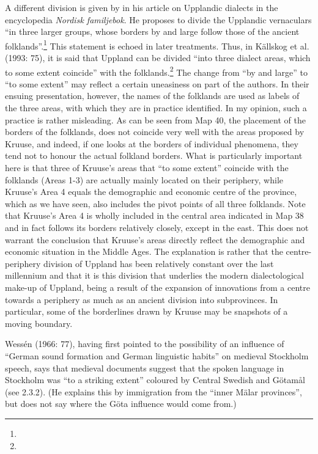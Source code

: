\begin{styleBodytextC}
A different division is given by \citet[1194]{Hesselman1920} in his article on Upplandic dialects in the encyclopedia \textit{Nordisk familjebok}. He proposes to divide the Upplandic vernaculars “in three larger groups, whose borders by and large follow those of the ancient folklands”.\footnote{} This statement is echoed in later treatments. Thus, in Källskog et al. (1993: 75), it is said that Uppland can be divided “into three dialect areas, which to some extent coincide” with the folklands.\footnote{} The change from “by and large” to “to some extent” may reflect a certain uneasiness on part of the authors. In their ensuing presentation, however, the names of the folklands are used as labels of the three areas, with which they are in practice identified. In my opinion, such a practice is rather misleading. As can be seen from Map 40, the placement of the borders of the folklands, does not coincide very well with the areas proposed by Kruuse, and indeed, if one looks at the borders of individual phenomena, they tend not to honour the actual folkland borders. What is particularly important here is that three of Kruuse’s areas that “to some extent” coincide with the folklands (Areas 1-3) are actually mainly located on their periphery, while Kruuse’s Area 4 equals the demographic and economic centre of the province, which as we have seen, also includes the pivot points of all three folklands. Note that Kruuse’s Area 4 is wholly included in the central area indicated in Map 38 and in fact follows its borders relatively closely, except in the east. This does not warrant the conclusion that Kruuse’s areas directly reflect the demographic and economic situation in the Middle Ages. The explanation is rather that the centre-periphery division of Uppland has been relatively constant over the last millennium and that it is this division that underlies the modern dialectological make-up of Uppland, being a result of the expansion of innovations from a centre towards a periphery as much as an ancient division into subprovinces. In particular, some of the borderlines drawn by Kruuse may be snapshots of a moving boundary.

\end{styleBodytextC}

\begin{styleBodytextC}
Wessén (1966: 77), having first pointed to the possibility of an influence of “German sound formation and German linguistic habits” on medieval Stockholm speech, says that medieval documents suggest that the spoken language in Stockholm was “to a striking extent” coloured by Central Swedish and Götamål (see 2.3.2). (He explains this by immigration from the “inner Mälar provinces”, but does not say where the Göta influence would come from.)

\end{styleBodytextC}


